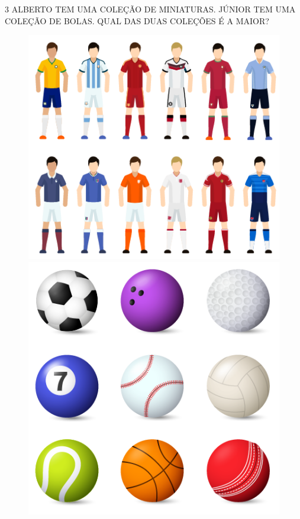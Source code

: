 


\num{3} ALBERTO TEM UMA COLEÇÃO DE MINIATURAS. JÚNIOR TEM UMA COLEÇÃO DE BOLAS. QUAL DAS DUAS COLEÇÕES É A MAIOR?


\begin{figure}[htpb!]
\includegraphics[width=.5\textwidth]{./media/SAEB_1ANO_MAT_FIGURA5.png}
\includegraphics[width=.45\textwidth]{./media/SAEB_1ANO_MAT_FIGURA5a.png}
\end{figure}



